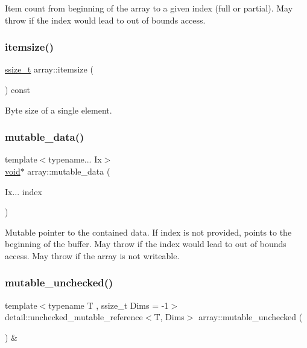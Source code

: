 Item count from beginning of the array to a given index (full or partial). May throw if the index would lead to out of bounds access. \mbox{\label{classarray_acd6aa4dba1e1db26fcfd21a323b4d4fa}} 
\subsubsection{\texorpdfstring{itemsize()}{itemsize()}}
{\footnotesize\ttfamily \mbox{\hyperlink{detail_2common_8h_ac430d16fc097b3bf0a7469cfd09decda}{ssize\+\_\+t}} array\+::itemsize (\begin{DoxyParamCaption}{ }\end{DoxyParamCaption}) const\hspace{0.3cm}{\ttfamily [inline]}}



Byte size of a single element. 

\mbox{\label{classarray_ad06996f0b02fa6dc86e79744cbef5d80}} 
\subsubsection{\texorpdfstring{mutable\_data()}{mutable\_data()}}
{\footnotesize\ttfamily template$<$typename... Ix$>$ \\
\mbox{\hyperlink{_s_d_l__opengles2__gl2ext_8h_ae5d8fa23ad07c48bb609509eae494c95}{void}}$\ast$ array\+::mutable\+\_\+data (\begin{DoxyParamCaption}\item[{Ix...}]{index }\end{DoxyParamCaption})\hspace{0.3cm}{\ttfamily [inline]}}

Mutable pointer to the contained data. If index is not provided, points to the beginning of the buffer. May throw if the index would lead to out of bounds access. May throw if the array is not writeable. \mbox{\label{classarray_a93018344b9a8d27eacbdd7837f6efcab}} 
\subsubsection{\texorpdfstring{mutable\_unchecked()}{mutable\_unchecked()}}
{\footnotesize\ttfamily template$<$typename T , ssize\+\_\+t Dims = -\/1$>$ \\
detail\+::unchecked\+\_\+mutable\+\_\+reference$<$T, Dims$>$ array\+::mutable\+\_\+unchecked (\begin{DoxyParamCaption}{ }\end{DoxyParamCaption}) \&\hspace{0.3cm}{\ttfamily [inline]}}

